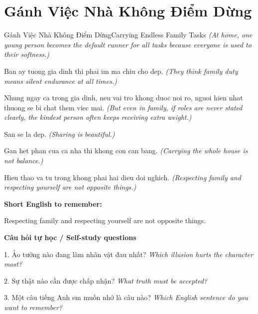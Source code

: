 \section{Gánh Việc Nhà Không Điểm Dừng}
\begin{truyen}{Gánh Việc Nhà Không Điểm Dừng}{Carrying Endless Family Tasks}
\textit{(At home, one young person becomes the default runner for all tasks because everyone is used to their softness.)}

Ban ay tuong gia dinh thi phai im ma chiu cho dep.
\textit{(They think family duty means silent endurance at all times.)}

Nhung ngay ca trong gia dinh, neu vai tro khong duoc noi ro, nguoi hien nhat thuong se bi chat them viec mai.
\textit{(But even in family, if roles are never stated clearly, the kindest person often keeps receiving extra weight.)}

San se la dep.
\textit{(Sharing is beautiful.)}

Gan het phan cua ca nha thi khong con can bang.
\textit{(Carrying the whole house is not balance.)}

\end{truyen}

\begin{baihoc}
Hieu thao va tu trong khong phai hai dieu doi nghich.
\textit{(Respecting family and respecting yourself are not opposite things.)}
\end{baihoc}

\begin{ghinhoanh}
\textbf{Short English to remember:}

Respecting family and respecting yourself are not opposite things.

\end{ghinhoanh}

\begin{tuhocnhanh}
\textbf{Câu hỏi tự học / Self-study questions}

1. Ảo tưởng nào đang làm nhân vật đau nhất? \textit{Which illusion hurts the character most?}

2. Sự thật nào cần được chấp nhận? \textit{What truth must be accepted?}

3. Một câu tiếng Anh em muốn nhớ là câu nào? \textit{Which English sentence do you want to remember?}
\end{tuhocnhanh}
\ngancach


